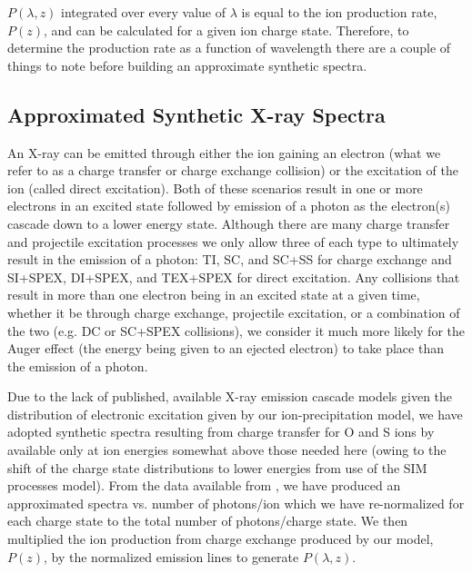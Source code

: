 \documentclass[draft]{agujournal2018}
\begin{document}
$P(\lambda,z)$ integrated over every value of $\lambda$ is equal to the ion production rate, $P(z)$, and can be calculated for a given ion charge state.
Therefore, to determine the production rate as a function of wavelength there are a couple of things to note before building an approximate synthetic spectra.

\subsection{Approximated Synthetic X-ray Spectra}
\label{sec:SynthXraySpec}

An X-ray can be emitted through either the ion gaining an electron (what we refer to as a charge transfer or charge exchange collision) or the excitation of the ion (called direct excitation).
Both of these scenarios result in one or more electrons in an excited state followed by emission of a photon as the electron(s) cascade down to a lower energy state.
Although there are many charge transfer and projectile excitation processes we only allow three of each type to ultimately result in the emission of a photon: TI, SC, and SC+SS for charge exchange and SI+SPEX, DI+SPEX, and TEX+SPEX for direct excitation.
Any collisions that result in more than one electron being in an excited state at a given time, whether it be through charge exchange, projectile excitation, or a combination of the two (e.g. DC or SC+SPEX collisions), we consider it much more likely for the Auger effect (the energy being given to an ejected electron) to take place than the emission of a photon.

Due to the lack of published, available X-ray emission cascade models given the distribution of electronic excitation given by our ion-precipitation model, we have adopted synthetic spectra resulting from charge transfer for O and S ions by \citet{hui2010} available only at ion energies somewhat above those needed here (owing to the shift of the charge state distributions to lower energies from use of the SIM processes model).
From the data available from \citet{hui2010}, we have produced an approximated spectra vs. number of photons/ion which we have re-normalized for each charge state to the total number of photons/charge state.
We then multiplied the ion production from charge exchange produced by our model, $P(z)$, by the normalized emission lines to generate $P(\lambda,z)$.
\end{document}
